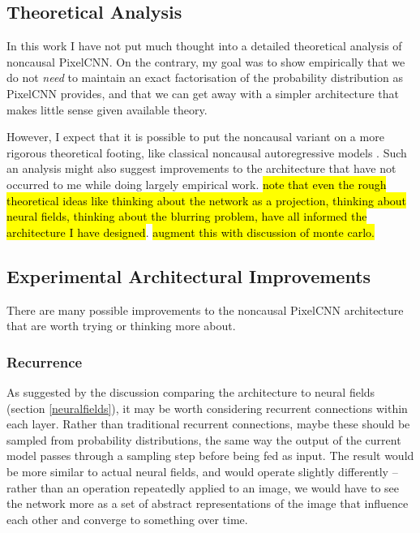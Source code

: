 \documentclass[11pt, a4paper]{book}
\begin{document}
\subsection{Theoretical Analysis}

In this work I have not put much thought into a detailed theoretical analysis of noncausal PixelCNN. On the contrary, my goal was to show empirically that we do not \emph{need} to maintain an exact factorisation of the probability distribution as PixelCNN provides, and that we can get away with a simpler architecture that makes little sense given available theory.

However, I expect that it is possible to put the noncausal variant on a more rigorous theoretical footing, like classical noncausal autoregressive models \citep{noncausalimage2,noncausaleco2}. Such an analysis might also suggest improvements to the architecture that have not occurred to me while doing largely empirical work. \hl{note that even the rough theoretical ideas like thinking about the network as a projection, thinking about neural fields, thinking about the blurring problem, have all informed the architecture I have designed}. \hl{augment this with discussion of monte carlo.}

\subsection{Experimental Architectural Improvements}

There are many possible improvements to the noncausal PixelCNN architecture that are worth trying or thinking more about.

\subsubsection{Recurrence}

As suggested by the discussion comparing the architecture to neural fields (section \ref{neuralfields}), it may be worth considering recurrent connections within each layer. Rather than traditional recurrent connections, maybe these should be sampled from probability distributions, the same way the output of the current model passes through a sampling step before being fed as input. The result would be more similar to actual neural fields, and would operate slightly differently -- rather than an operation repeatedly applied to an image, we would have to see the network more as a set of abstract representations of the image that influence each other and converge to something over time.
\end{document}
